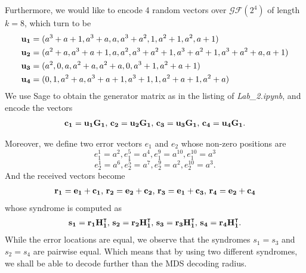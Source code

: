 \documentclass{article}
\begin{document}
Furthermore, we would like to encode 4 random vectors over $\mathcal{GF}(2^4)$ of length $k=8$, which turn to be
\begin{align*}
\vb{u_{1}} &= (a^3 + a + 1, a^3 + a, a, a^3 + a^2, 1, a^2 + 1, a^2, a + 1) \\
\vb{u_{2}} &= (a^2 + a, a^3 + a + 1, a, a^2, a^3 + a^2 + 1, a^3 + a^2 + 1, a^3 + a^2 + a, a + 1) \\
\vb{u_{3}} &= (a^2, 0, a, a^2 + a, a^2 + a, 0, a^3 + 1, a^2 + a + 1) \\
\vb{u_{4}} &= (0, 1, a^2 + a, a^3 + a + 1, a^3 + 1, 1, a^2 + a + 1, a^2 + a)
\end{align*}
We use Sage to obtain the generator matrix as in the listing of \textit{Lab\_2.ipynb}, and encode the vectors
\begin{align*}
\vb{c_{1}} = \vb{u_{1}}\vb{G_1}\text{, }
\vb{c_{2}} = \vb{u_{2}}\vb{G_1}\text{, }
\vb{c_{3}} = \vb{u_{3}}\vb{G_1}\text{, }
\vb{c_{4}} = \vb{u_{4}}\vb{G_1}.
\end{align*} 

Moreover, we define two error vectors $e_1$ and $e_2$ whose non-zero positions are
\begin{equation*}
e_1^1 = a^2, e_1^5 = a^4, e_1^9 = a^{10}, e_1^{10} = a^3
\end{equation*} 
\begin{equation*}
e_2^1 = a^6, e_2^5 = a^7, e_2^9 = a^2, e_2^{10} = a^3.
\end{equation*} 
And the received vectors become
\begin{align*}
\vb{r_1} = \vb{e_1} + \vb{c_1}\text{, }
\vb{r_2} = \vb{e_2} + \vb{c_2}\text{, }
\vb{r_3} = \vb{e_1} + \vb{c_3}\text{, }
\vb{r_4} = \vb{e_2} + \vb{c_4} 
\end{align*}
whose syndrome is computed as
\begin{align*}
\vb{s_{1}} = \vb{r_{1}}\vb{H_1^\intercal}\text{, }
\vb{s_{2}} = \vb{r_{2}}\vb{H_1^\intercal}\text{, }
\vb{s_{3}} = \vb{r_{3}}\vb{H_1^\intercal}\text{, }
\vb{s_{4}} = \vb{r_{4}}\vb{H_1^\intercal}.
\end{align*}
While the error locations are equal, we observe that the syndromes $s_{1} = s_{3}$ and $s_{2} = s_{4}$ are pairwise equal. Which means that by using two different syndromes, we shall be able to decode further than the MDS decoding radius.
\end{document}

